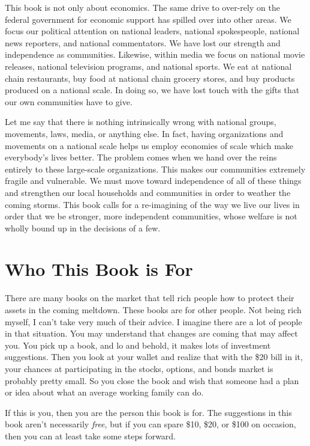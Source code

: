 This book is not only about economics. The same drive to over-rely on
the federal government for economic support has spilled over into other
areas. We focus our political attention on national leaders, national
spokespeople, national news reporters, and national commentators. We
have lost our strength and independence as communities. Likewise,
within media we focus on national movie releases, national television
programs, and national sports. We eat at national chain restaurants,
buy food at national chain grocery stores, and buy products produced on
a national scale. In doing so, we have lost touch with the gifts that
our own communities have to give. 


Let me say that there is nothing intrinsically wrong with national
groups, movements, laws, media, or anything else. In fact, having
organizations and movements on a national scale helps us employ
economies of scale which make everybody’s lives better. The problem
comes when we hand over the reins entirely to these large-scale
organizations. This makes our communities extremely fragile and
vulnerable. We must move toward independence of all of these things and
strengthen our local households and communities in order to weather the
coming storms. This book calls for a re-imagining of the way we live
our lives in order that we be stronger, more independent communities,
whose welfare is not wholly bound up in the decisions of a few.

\section{Who This Book is For}

There are many books on the market that tell rich people how to protect
their assets in the coming meltdown. These books are for other people.
Not being rich
myself, I can’t take
very much of their advice. I imagine there are a lot of people in that
situation. You may understand that changes are coming that may affect
you. You pick up a book, and lo and behold, it makes lots of investment
suggestions. Then you look at your wallet and realize that with the
\$20 bill in it, your chances at participating in the stocks, options,
and bonds market is probably pretty small. So you close the book and
wish that someone had a plan or idea about what an average working
family can do.


If this is you, then you are the person this book is for. The
suggestions in this book aren’t necessarily \textit{free}, but if you
can spare \$10, \$20, or \$100 on occasion, then you can at least take
some steps forward.


